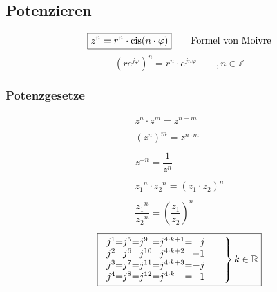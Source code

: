 
\subsection{Potenzieren}
\[ \boxed{z^n = r^n \cdot \operatorname{cis}(n \cdot \varphi)} 
\qquad \text{Formel von Moivre} \]
\[ \boxed{\left( r e^{j \varphi} \right)^n = r^n \cdot e^{j n \varphi} 
\qquad , n \in \mathbb{Z}} \]

\subsubsection{Potenzgesetze}
\[ \boxed{\begin{array}{l}
z^n \cdot z^m = z^{n +m}\\\\
{(z^n)}^m = z^{n \cdot m}\\\\
z^{-n} = \dfrac{1}{z^n}\\\\
{z_1}^n \cdot {z_2}^n = (z_1 \cdot z_2)^n\\\\
\dfrac{{z_1}^n}{{z_2}^n} = \left(\dfrac{z_1}{z_2}\right)^n
\end{array}} \]
\[ \boxed{\left.\begin{array}{l@{}l@{}l@{}l@{}l@{}l@{}l@{}l@{}r@{}}
j^1 &=& j^5 &=& j^{ 9} &=& j^{4 \cdot k + 1} &=&  j \\
j^2 &=& j^6 &=& j^{10} &=& j^{4 \cdot k + 2} &=& -1 \\
j^3 &=& j^7 &=& j^{11} &=& j^{4 \cdot k + 3} &=& -j \\
j^4 &=& j^8 &=& j^{12} &=& j^{4 \cdot k}     &=&  1 \\
\end{array} \qquad \right\rbrace k \in \mathbb{R}} \]
